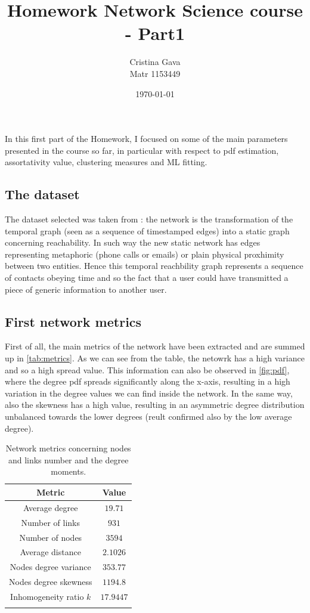 \documentclass[12pt,a4paper]{article}
\title{\blue Homework Network Science course - Part1}
\author{Cristina Gava\\%
Matr 1153449}
\date{\today}
\begin{document}
\maketitle

In this first part of the Homework, I focused on some of the main parameters presented in the course so far, in particular with respect to pdf estimation, assortativity value, clustering measures and ML fitting.

\subsection*{The dataset}
The dataset selected was taken from \cite{repo}: the network is the transformation of the temporal graph (seen as a sequence of timestamped edges) into a static graph concerning reachability. In such way the new static network has edges representing metaphoric (phone calls or emails) or plain physical proxhimity between two entities. Hence this temporal reachbility graph represents a sequence of contacts obeying time and so the fact that a user could have transmitted a piece of generic information to another user.

\subsection*{First network metrics}
First of all, the main metrics of the network have been extracted and are summed up in \autoref{tab:metrics}. As we can see from the table, the netowrk has a high variance and so a high spread value. This information can also be observed in \autoref{fig:pdf}, where the degree pdf spreads significantly along the x-axis, resulting in a high variation in the degree values we can find inside the network. In the same way, also the skewness has a high value, resulting in an asymmetric degree distribution unbalanced towards the lower degrees (reult confirmed also by the low average degree).

\begin{table}
\centering
\begin{tabular}{c|c}
  \firsthline
  Metric & Value\\
  \hline
    Average degree & $19.71$\\
    Number of links & $931$\\
    Number of nodes & $3594$\\
    Average distance & $2.1026$\\
    Nodes degree variance & $353.77$\\
    Nodes degree skewness & $1194.8$\\
    Inhomogeneity ratio $k$ & $17.9447$\\
  \lasthline
\end{tabular}
\caption{Network metrics concerning nodes and links number and the degree moments.}
\label{tab:metrics}
\end{table}
\end{document}
